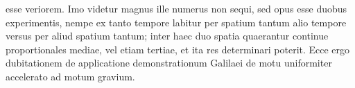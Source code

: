 esse veriorem. Imo videtur magnus ille numerus non sequi, sed opus esse duobus experimentis,
nempe ex tanto tempore labitur per spatium tantum alio tempore versus per aliud spatium tantum;
inter haec duo spatia quaerantur continue proportionales mediae, vel etiam tertiae, et ita
res determinari poterit.
Ecce ergo dubitationem de applicatione demonstrationum
Galilaei\protect{}
de motu uniformiter accelerato\protect{} ad motum gravium.%